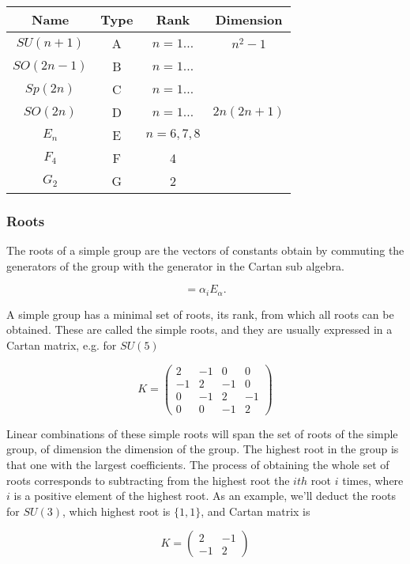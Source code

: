 \documentclass[12pt]{article}
\begin{document}
\begin{tabular}{c | c | c | c}
Name & Type & Rank & Dimension \\ 
\hline
$SU(n+1)$ & A & $n=1\dots$ & $n^2 -1$ \\
$SO(2n-1)$ & B & $n=1\dots$ & \\
$Sp(2n)$ & C & $n=1\dots$ & \\
$SO(2n)$ & D & $n=1\dots$ & $2n(2n+1)$ \\
$E_n$ & E & $n=6,7,8$ & \\
$F_4$ & F & 4 & \\
$G_2$ & G & 2 & 
\end{tabular}


\subsubsection{Roots}

The roots of a simple group are the vectors of constants obtain by commuting the generators of the group with the generator in the Cartan sub algebra.

\begin{equation}
[H_i, E_\alpha] = \alpha_i E_\alpha.
\end{equation}

A simple group has a minimal set of roots, its rank, from which all roots can be obtained. These are called the simple roots, and they are usually expressed in a Cartan matrix, e.g. for $SU(5)$

\begin{equation}
K = \left( 
\begin{array}{cccc}
2 & -1 & 0 & 0 \\
-1 & 2 & -1 & 0 \\
0 & -1 & 2 & -1 \\
0 & 0 & -1 & 2
\end{array}
\right)
\end{equation}

Linear combinations of these simple roots will span the set of roots of the simple group, of dimension the dimension of the group. The highest root in the group is that one with the largest coefficients. The process of obtaining the whole set of roots corresponds to subtracting from the highest root the $ith$ root $i$ times, where $i$ is a positive element of the highest root. As an example, we'll deduct the roots for $SU(3)$, which highest root is $\{1,1\}$, and Cartan matrix is 

\begin{equation}
K = \left( 
\begin{array}{cc}
2 & -1  \\
-1 & 2 
\end{array}
\right)
\end{equation}
\end{document}
